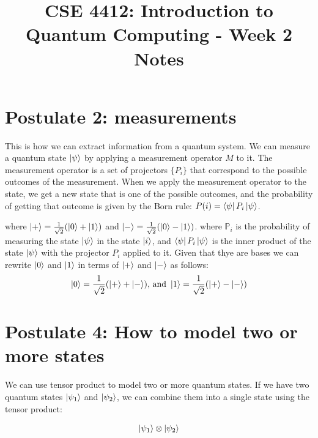 \documentclass[11pt]{article}
\title{CSE 4412: Introduction to Quantum Computing - Week 2 Notes}
\author{}
\date{}
\begin{document}
\maketitle
\section*{Postulate 2: measurements}
This is how we can extract information from a quantum system. We can measure a quantum state $\ket{\psi}$ by applying a measurement operator $M$ to it. The measurement operator is a set of projectors $\{P_i\}$ that correspond to the possible outcomes of the measurement. When we apply the measurement operator to the state, we get a new state that is one of the possible outcomes, and the probability of getting that outcome is given by the Born rule: $P(i) = \bra{\psi} P_i \ket{\psi}$. 
\vspace{1cm}

where $\ket{+} = \frac{1}{\sqrt{2}}(\ket{0} + \ket{1})$ and $\ket{-} = \frac{1}{\sqrt{2}}(\ket{0} - \ket{1})$. where $\mathbb{P}_i$ is the probability of measuring the state $\ket{\psi}$ in the state $\ket{i}$, and $\bra{\psi} P_i \ket{\psi}$ is the inner product of the state $\ket{\psi}$ with the projector $P_i$ applied to it. Given that thye are bases we can rewrite $\ket{0}$ and $\ket{1}$ in terms of $\ket{+}$ and $\ket{-}$ as follows: 
\[
\ket{0} = \frac{1}{\sqrt{2}}(\ket{+} + \ket{-}) \\ {\text{, and }} \\
\ket{1} = \frac{1}{\sqrt{2}}(\ket{+} - \ket{-})
\]

\section*{Postulate 4: How to model two or more states}
We can use tensor product to model two or more quantum states. If we have two quantum states $\ket{\psi_1}$ and $\ket{\psi_2}$, we can combine them into a single state using the tensor product:

\[
\ket{\psi_1} \otimes \ket{\psi_2}
\]
\end{document}
